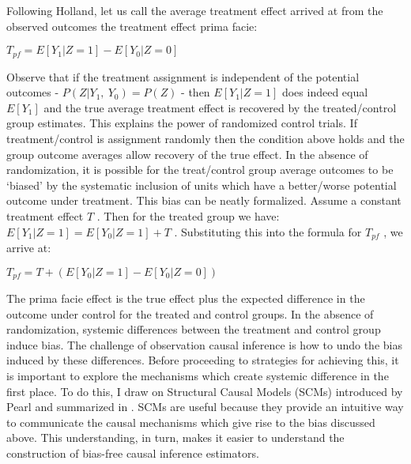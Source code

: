 \documentclass[../main.tex]{subfiles}
\begin{document}
\vspace{\baselineskip}
Following Holland, let us call the average treatment effect arrived at from the observed outcomes the treatment effect prima facie:\par


\vspace{\baselineskip}
\begin{adjustwidth}{0.5in}{0.0in}
 \( T_{pf}=E \left[ Y_{1}  \vert  Z=1 \right]  - E \left[ Y_{0}  \vert  Z=0 \right]  \) \par

\end{adjustwidth}


\vspace{\baselineskip}
Observe that if the treatment assignment is independent of the potential outcomes -  \( P \left( Z  \vert  Y_{1},~Y_{0} \right)  = P \left( Z \right)  \)  - then  \( E \left[ Y_{1}  \vert  Z=1 \right]  \) does indeed equal  \( E \left[ Y_{1} \right]  \)  and the true average treatment effect is recovered by the treated/control group estimates. This explains the power of randomized control trials. If treatment/control is assignment randomly then the condition above holds and the group outcome averages allow recovery of the true effect. In the absence of randomization, it is possible for the treat/control group average outcomes to be ‘biased’ by the systematic inclusion of units which have a better/worse potential outcome under treatment. This bias can be neatly formalized. Assume a constant treatment effect  \( T \) . Then for the treated group we have:  \( E \left[ Y_{1}  \vert  Z=1 \right]  = E \left[ Y_{0}  \vert  Z=1 \right]  + T \) . Substituting this into the formula for  \( T_{pf} \) , we arrive at:\par


\vspace{\baselineskip}
\begin{adjustwidth}{0.5in}{0.0in}
 \( T_{pf} = T + \left( E \left[ Y_{0}  \vert  Z = 1 \right]  - E \left[ Y_{0}  \vert  Z =0 \right]  \right)  \) \par

\end{adjustwidth}


\vspace{\baselineskip}
The prima facie effect is the true effect plus the expected difference in the outcome under control for the treated and control groups. In the absence of randomization, systemic differences between the treatment and control group induce bias. The challenge of observation causal inference is how to undo the bias induced by these differences. Before proceeding to strategies for achieving this, it is important to explore the mechanisms which create systemic difference in the first place. To do this, I draw on Structural Causal Models (SCMs) introduced by Pearl and summarized in \textcite{Pearl2009CausalOverview}. SCMs are useful because they provide an intuitive way to communicate the causal mechanisms which give rise to the bias discussed above. This understanding, in turn, makes it easier to understand the construction of bias-free causal inference estimators.\par
\end{document}
